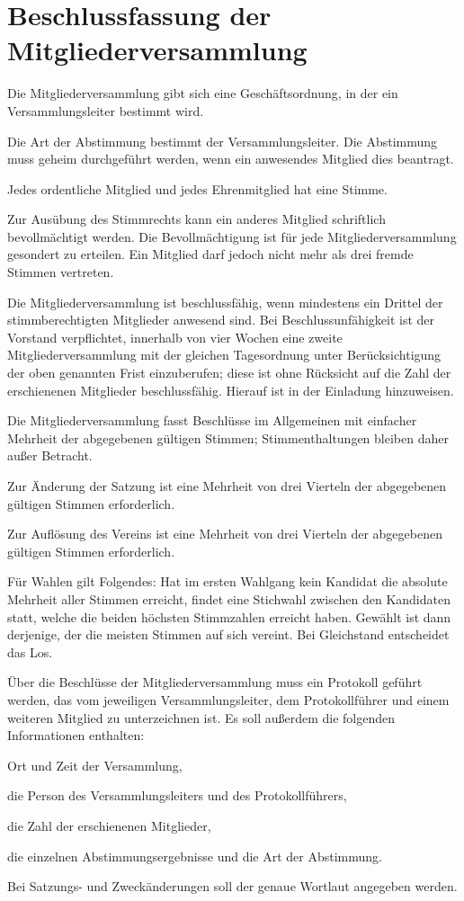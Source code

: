 \section{Beschlussfassung der Mitgliederversammlung}
\begin{para}
	\item Die Mitgliederversammlung gibt sich eine Geschäftsordnung, in der ein Versammlungsleiter bestimmt wird.
	\item Die Art der Abstimmung bestimmt der Versammlungsleiter. Die Abstimmung muss geheim durchgeführt werden, wenn ein anwesendes Mitglied dies beantragt.
	\item Jedes ordentliche Mitglied und jedes Ehrenmitglied hat eine Stimme.
	\item Zur Ausübung des Stimmrechts kann ein anderes Mitglied schriftlich bevoll\-mächtigt werden. Die Bevollmächtigung ist für jede Mitgliederversammlung gesondert zu erteilen. Ein Mitglied darf jedoch nicht mehr als drei fremde Stimmen vertreten.
	\item Die Mitgliederversammlung ist beschlussfähig, wenn mindestens ein Drittel der stimmberechtigten Mitglieder anwesend sind.
	Bei Beschlussunfähigkeit ist der Vorstand verpflichtet, innerhalb von vier Wochen eine zweite Mitglieder\-ver\-sammlung mit der gleichen Tagesordnung unter Berücksichtigung der oben genannten Frist einzuberufen; diese ist ohne Rücksicht auf die Zahl der erschienenen Mitglieder beschlussfähig. Hierauf ist in der Einladung hinzuweisen.
	\item Die Mitgliederversammlung fasst Beschlüsse im Allgemeinen mit einfacher Mehrheit der abgegebenen gültigen Stimmen; Stimmenthaltungen bleiben daher außer Betracht.
	\item Zur Änderung der Satzung ist eine Mehrheit von drei Vierteln der abgegebenen gültigen Stimmen erforderlich.
	\item Zur Auflösung des Vereins ist eine Mehrheit von drei Vierteln der abgegebenen gültigen Stimmen erforderlich.
	\item Für Wahlen gilt Folgendes: Hat im ersten Wahlgang kein Kandidat die absolute Mehrheit aller Stimmen erreicht, findet eine Stichwahl zwischen den Kandidaten statt, welche die beiden höchsten Stimmzahlen erreicht haben. Gewählt ist dann derjenige, der die meisten Stimmen auf sich vereint. Bei Gleichstand entscheidet das Los.
	\item Über die Beschlüsse der Mitgliederversammlung muss ein Protokoll geführt werden, das vom jeweiligen Versammlungsleiter, dem Protokollführer und einem weiteren Mitglied zu unterzeichnen ist.
	Es soll außerdem die folgenden Informationen enthalten:
	\begin{subpara}
		\item Ort und Zeit der Versammlung, 
		\item die Person des Versammlungsleiters und des Protokollführers, 
		\item die Zahl der erschienenen Mitglieder, 
		\item die einzelnen Abstimmungsergebnisse und die Art der Abstimmung. 
	\end{subpara}
	Bei Satzungs- und Zweckänderungen soll der genaue Wortlaut angegeben werden.
\end{para}

